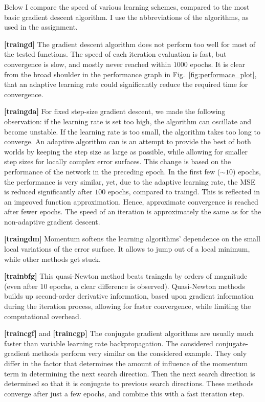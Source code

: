 \documentclass[10pt,a4paper]{article}
\begin{document}
Below I compare the speed of various learning schemes, compared to the most basic gradient descent algorithm. I use the abbreviations of the algorithms, as used in the assignment.

\textbf{[traingd]} The gradient descent algorithm does not perform too well for most of the tested functions. The speed of each iteration evaluation is fast, but convergence is slow, and mostly never reached within $1000$ epochs. It is clear from the broad shoulder in the performance graph in Fig.~\ref{fig:performace_plot}, that an adaptive learning rate could significantly reduce the required time for convergence.

\textbf{[traingda]} For fixed step-size gradient descent, we made the following observation: if the learning rate  is set too high, the algorithm can oscillate and become unstable. If the learning rate is too small, the algorithm takes too long to converge. An adaptive algorithm can is an attempt to provide the best of both worlds by keeping the step size as large as possible, while allowing for smaller step sizes for locally complex error surfaces. This change is based on the performance of the network in the preceding epoch. 
In the first few ($\sim 10$) epochs, the performance is very similar, yet, due to the adaptive learning rate, the MSE is reduced significantly after $100$ epochs, compared to traingd. This is reflected in an improved function approximation. Hence, approximate convergence is reached after fewer epochs. The speed of an iteration is approximately the same as for the non-adaptive gradient descent. 

\textbf{[traingdm]} Momentum softens the learning algorithms' dependence on the small local variations of the error surface. It allows to jump out of a local minimum, while other methods get stuck.

\textbf{[trainbfg]} This quasi-Newton method beats traingda by orders of magnitude (even after $10$ epochs, a clear difference is observed). Quasi-Newton methods builds up second-order derivative information, based upon gradient information during the iteration process, allowing for faster convergence, while limiting the computational overhead.

\textbf{[traincgf]} and \textbf{[traincgp]} The conjugate gradient algorithms are usually much faster than variable learning rate backpropagation. The considered conjugate-gradient methods perform very similar on the considered example. They only differ in the factor that determines the amount of influence of the momentum term in determining the next search direction. Then the next search direction is determined so that it is conjugate to previous search directions. These methods converge after just a few epochs, and combine this with a fast iteration step.
\end{document}
